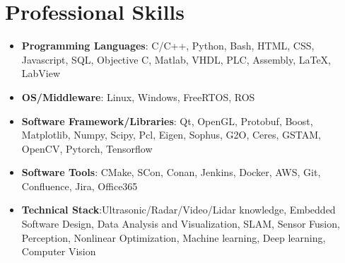 \documentclass[letterpaper,11pt]{article}
\newcommand{\resumeSubHeadingListStart}{\begin{itemize}[leftmargin=*]}
\newcommand{\resumeSubHeadingListEnd}{\end{itemize}}
\begin{document}
\section{Professional Skills}
  \resumeSubHeadingListStart
    \item{
      \textbf{Programming Languages}{: C/C++, Python, Bash, HTML, CSS, Javascript, SQL, Objective C, Matlab, VHDL, PLC, Assembly, \LaTeX, LabView}
	}
    \item{
      \textbf{OS/Middleware}{: Linux, Windows, FreeRTOS, ROS}
  }

    \item{
      \textbf{Software Framework/Libraries}{: Qt, OpenGL, Protobuf, Boost, Matplotlib, Numpy, Scipy, Pcl, Eigen, Sophus, G2O, Ceres, GSTAM, OpenCV, Pytorch, Tensorflow}
  }
    \item{
      \textbf{Software Tools}{: CMake, SCon, Conan, Jenkins, Docker, AWS, Git, Confluence, Jira, Office365}
  }

  \item{
      \textbf{Technical Stack}{:Ultrasonic/Radar/Video/Lidar knowledge, Embedded Software Design, Data Analysis and Visualization, SLAM, Sensor Fusion, Perception, Nonlinear Optimization, Machine learning, Deep learning, Computer Vision}
  }

  \resumeSubHeadingListEnd

\end{document}
